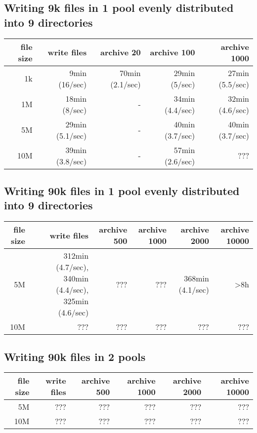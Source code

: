 \documentclass[a4paper,8pt]{scrartcl}
\begin{document}
\subsection{Writing 9k files in 1 pool evenly distributed into 9 directories}

\begin{tabular}{|r|r|r|r|r|}
  \hline
  file size & write files  & archive 20 & archive 100 & archive 1000 \\
  \hline
  1k        &  9min (16/sec)  & 70min (2.1/sec) & 29min (5/sec) & 27min (5.5/sec) \\
  \hline
  1M        & 18min (8/sec)   &        -        & 34min (4.4/sec) & 32min (4.6/sec) \\
  \hline
  5M        & 29min (5.1/sec) &        -        & 40min (3.7/sec) & 40min (3.7/sec) \\
  \hline
  10M       & 39min (3.8/sec) &        -        & 57min (2.6/sec) & ??? \\
  \hline
\end{tabular}

\subsection{Writing 90k files in 1 pool evenly distributed into 9 directories}

\begin{tabular}{|r|r|r|r|r|r|}
  \hline
  file size & write files  & archive 500 & archive 1000 & archive 2000 & archive 10000 \\
  \hline
  5M        & 312min (4.7/sec), 340min (4.4/sec), 325min (4.6/sec) & ??? & ??? & 368min (4.1/sec) & >8h \\
  \hline
  10M       & ??? & ??? & ??? & ??? & ??? \\
  \hline
\end{tabular}

\subsection{Writing 90k files in 2 pools}

\begin{tabular}{|r|r|r|r|r|r|}
  \hline
  file size & write files  & archive 500 & archive 1000 & archive 2000 & archive 10000 \\
  \hline
  5M        & ??? & ??? & ??? & ??? & ??? \\
  \hline
  10M       & ??? & ??? & ??? & ??? & ??? \\
  \hline
\end{tabular}
\end{document}

